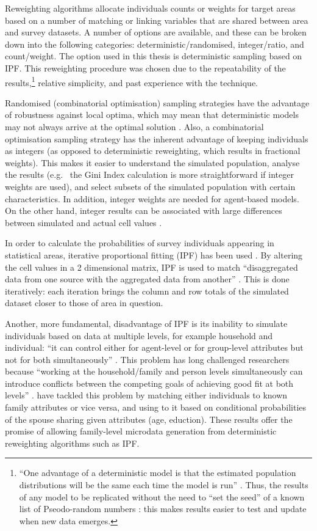 Reweighting algorithms allocate individuals counts or weights for target
areas based on a number of matching or linking variables that are shared between
area and survey datasets. A number of options are available, and these can be
broken down into the following categories:
deterministic/randomised, integer/ratio, and count/weight.
The option used in this thesis is deterministic
sampling based on IPF. This reweighting procedure was
chosen due to the repeatability of the
results,\footnote{``One
advantage of a deterministic model is that the estimated population
distributions will be the same each time the model is run'' \citep{Smith2009}⁠.
Thus, the results of any model to be replicated
without the need to ``set the seed'' of a known list of
Pseodo-random numbers \citep{Robert2009}: this makes results easier to
test and update when new data emerges.}
relative simplicity, and past experience with
the technique.

Randomised (combinatorial optimisation) sampling strategies have the advantage
of robustness against local
optima, which may mean that deterministic models may not always arrive at the
optimal solution \citep{Williamson1998}.
Also, a combinatorial optimisation sampling strategy has the inherent advantage of
keeping individuals as integers (as opposed to deterministic reweighting,
which results in fractional weights). This makes it easier to
understand the simulated population, analyse the results 
(e.g.~ the Gini Index calculation
is more straightforward if integer weights are used), and select
subsets of the simulated population with certain characteristics.
In addition, integer weights are needed for agent-based models. On the other
hand, integer results can be associated with large differences between simulated
and actual cell values \citep{Ballas2005}⁠.

In order to calculate the probabilities of survey individuals appearing in
statistical areas, iterative proportional fitting (IPF) has been used . By
altering the cell values in a 2 dimensional matrix, IPF is used to match
``disaggregated data from one source with the aggregated data from another''
\citep[p.~1]{Norman1999a}⁠. This is done iteratively: each iteration brings the column and
row totals of the simulated dataset closer to those of area in question.

Another, more fundamental, disadvantage of IPF is its inability to simulate
individuals based on data at multiple levels, for example household and
individual: ``it can control either for agent-level or for group-level
attributes but not for both simultaneously'' \citep[p.~5]{Muller2010}.
This problem has long challenged researchers because ``working at the
household/family and person levels simultaneously can introduce conflicts
between the competing goals of achieving good fit at both levels''
\citet[p.~694]{Pritchard2012}. \citet{Pritchard2012} have tackled this problem
by matching either individuals to known family attributes or vice versa, and
using  to it based on conditional probabilities of the spouse sharing given
attributes (age, eduction). These results offer the promise of allowing
family-level microdata generation from deterministic reweighting algorithms
such as IPF.

